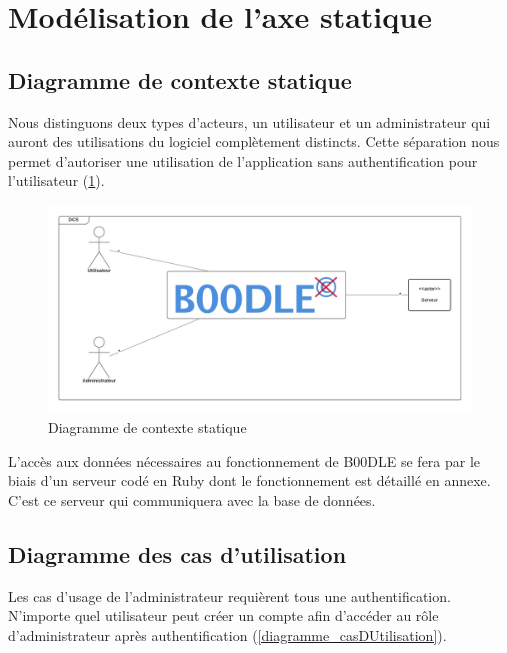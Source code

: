 \documentclass[titlepage]{report}
\begin{document}
\section{Modélisation de l'axe statique}

\subsection{Diagramme de contexte statique}

Nous distinguons deux types d'acteurs, un utilisateur et un administrateur qui auront des utilisations du logiciel complètement distincts. 
Cette séparation nous permet d'autoriser une utilisation de l'application sans authentification pour l'utilisateur (\ref{diagramme_contexteStatique}). 

\begin{figure}[h]
	\caption{Diagramme de contexte statique}
	\label{diagramme_contexteStatique}
	\centering
	\includegraphics[scale=0.7]{figures/diagrammes/contexteStatique.png}
\end{figure}

L'accès aux données nécessaires au fonctionnement de B00DLE se fera par le biais d'un serveur codé en Ruby dont le fonctionnement est détaillé en annexe. C'est ce serveur qui communiquera avec la base de données.

\subsection{Diagramme des cas d'utilisation}

\par Les cas d'usage de l'administrateur requièrent tous une authentification. N'importe quel utilisateur peut créer un compte afin d'accéder au rôle d'administrateur après authentification (\ref{diagramme_casDUtilisation}).
\end{document}
